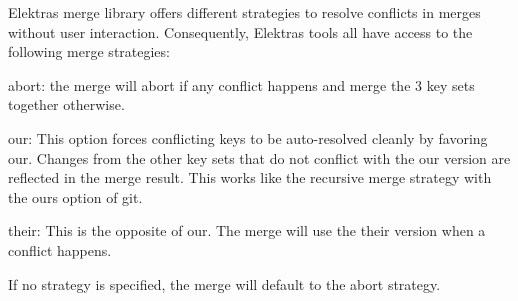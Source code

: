 \label{doc_help_elektra-cmerge-strategy_md_md_doc_help_elektra_cmerge_strategy}%
%
 Elektra\textquotesingle{}s merge library offers different strategies to resolve conflicts in merges without user interaction. Consequently, Elektra\textquotesingle{}s tools all have access to the following merge strategies\+:


\begin{DoxyItemize}
\item {\ttfamily abort}\+: the merge will abort if any conflict happens and merge the 3 key sets together otherwise.
\item {\ttfamily our}\+: This option forces conflicting keys to be auto-\/resolved cleanly by favoring {\ttfamily our}. Changes from the other key sets that do not conflict with the {\ttfamily our} version are reflected in the merge result. This works like the recursive merge strategy with the {\ttfamily ours} option of git.
\item {\ttfamily their}\+: This is the opposite of {\ttfamily our}. The merge will use the {\ttfamily their} version when a conflict happens.
\end{DoxyItemize}

If no strategy is specified, the merge will default to the abort strategy. 